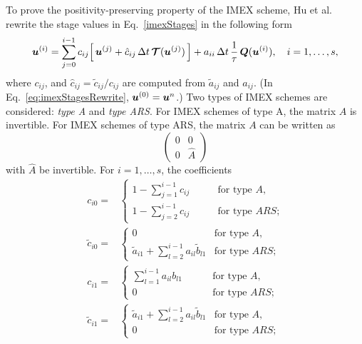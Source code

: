 To prove the positivity-preserving property of the IMEX scheme, Hu et al. \cite{hu_etal_2017} rewrite the stage values in Eq.~\eqref{imexStages} in the following form
\begin{equation}
  \boldsymbol{u}^{(i)}
  =\sum_{j=0}^{i-1}c_{ij}\Big[\,\boldsymbol{u}^{(j)}+\hat{c}_{ij}\,\Delta t\,\boldsymbol{\mathcal{T}}(\boldsymbol{u}^{(j)})\,\Big]
  +a_{ii}\,\Delta t\,\frac{1}{\tau}\,\boldsymbol{Q}(\boldsymbol{u}^{(i)}),\quad i=1,\ldots,s,
  \label{eq:imexStagesRewrite}
\end{equation}
where $c_{ij}$, and $\hat{c}_{ij}=\tilde{c}_{ij}/c_{ij}$ are computed from $\tilde{a}_{ij}$ and $a_{ij}$.
(In Eq.~\eqref{eq:imexStagesRewrite}, $\boldsymbol{u}^{(0)}=\boldsymbol{u}^{n}$.)  
Two types of IMEX schemes are considered: \emph{type A} and \emph{type ARS}.  
For IMEX schemes of type A, the matrix $A$ is invertible.  
For IMEX schemes of type ARS, the matrix $A$ can be written as
\[\left( 
   \begin{matrix} 
       0 & 0 \\ 
       0 & \hat{A}
   \end{matrix}
\right)\]
with $\hat{A}$ be invertible.
For $i=1,\ldots,s$, the coefficients
\begin{align*}
  c_{i0}
  =&\left\{
  \begin{array}{cl}
    1 - \sum_{j=1}^{i-1}c_{ij}  & \qquad \text{for type $A$,} \\
    1 - \sum_{j=2}^{i-1}c_{ij}  & \qquad \text{for type $ARS$;}
  \end{array}
  \right.\\
  \tilde{c}_{i0}
  =&\left\{
  \begin{array}{cl}
    0  & \text{for type $A$,} \\
   \tilde{a}_{i1} + \sum_{l=2}^{i-1}a_{il}\tilde{b}_{l1}  & \text{for type $ARS$;}
  \end{array}
  \right.\\
  c_{i1}
    =&\left\{
    \begin{array}{cl}
      \sum_{l =1}^{i-1} a_{il}b_{l1} & \qquad ~\text{for type $A$,} \\
      0  & \qquad ~\text{for type $ARS$;}
    \end{array}
    \right.\\
    \tilde{c}_{i1}
    =&\left\{
      \begin{array}{cl}
       \tilde{a}_{i1} + \sum_{l=2}^{i-1}a_{il}\tilde{b}_{l1} & \text{for type $A$,} \\
       0  & \text{for type $ARS$;}
      \end{array}
      \right.
\end{align*}
